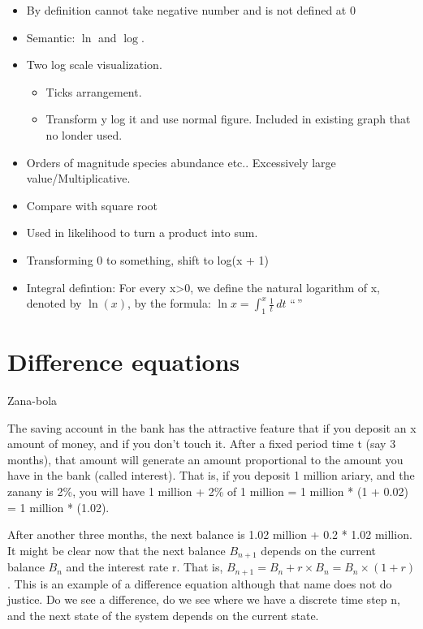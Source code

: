 \documentclass[
  letterpaper,
  DIV=11,
  numbers=noendperiod]{scrreprt}
\providecommand{\tightlist}{%
  \setlength{\itemsep}{0pt}\setlength{\parskip}{0pt}}
\begin{document}
\begin{itemize}
\item
  By definition cannot take negative number and is not defined at 0
\item
  Semantic: \(\ln\) and \(\log\).
\item
  Two log scale visualization.

  \begin{itemize}
  \tightlist
  \item
    Ticks arrangement.
  \item
    Transform y log it and use normal figure. Included in existing graph
    that no londer used.
  \end{itemize}
\item
  Orders of magnitude species abundance etc.. Excessively large
  value/Multiplicative.
\item
  Compare with square root
\item
  Used in likelihood to turn a product into sum.
\item
  Transforming 0 to something, shift to log(x + 1)
\item
  Integral defintion: For every x\textgreater0, we define the natural
  logarithm of x, denoted by \(\ln(x)\), by the formula:
  \(\ln x = \int_{1}^{x} \frac{1}{t} \, dt\) ``\,''
\end{itemize}

\chapter{Difference equations}\label{sec-difference}

Zana-bola

The saving account in the bank has the attractive feature that if you
deposit an x amount of money, and if you don't touch it. After a fixed
period time t (say 3 months), that amount will generate an amount
proportional to the amount you have in the bank (called interest). That
is, if you deposit 1 million ariary, and the zanany is 2\%, you will
have 1 million + 2\% of 1 million = 1 million * (1 + 0.02) = 1 million *
(1.02).

After another three months, the next balance is 1.02 million + 0.2 *
1.02 million. It might be clear now that the next balance \(B_{n+1}\)
depends on the current balance \(B_n\) and the interest rate r. That is,
\(B_{n+1} = B_n + r \times B_n = B_n \times (1 + r)\). This is an
example of a difference equation although that name does not do justice.
Do we see a difference, do we see where we have a discrete time step n,
and the next state of the system depends on the current state.
\end{document}
